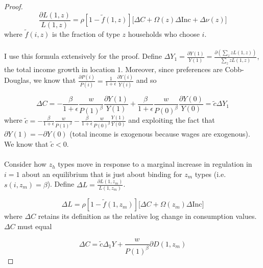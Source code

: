\documentclass[12pt]{article}
\begin{document}
\begin{enumerate}
\begin{proof}
		 \begin{equation}\label{AppendixEq:PopulationFormula}
			\frac{\partial L(1, z)}{L(1, z)} = \rho[1 - \tilde{f}(1, z)]\big[ \Delta C + \Omega(z)\Delta \text{Inc} + \Delta \nu(z) \big]
					 \end{equation}
		where $\tilde{f}(i, z)$ is the fraction of type $z$ households who choose $i$. 
		
		\paragraph*{}
		I use this formula extensively for the proof. Define $\Delta Y_{1} = \frac{\partial Y(1)}{Y(1)} =  \frac{\partial (\sum_{z}zL(1, z))}{\sum_{z}zL(1, z)}$, the total income growth in location $1$. Moreover, since preferences are Cobb-Douglas, we know that $\frac{\partial P(i)}{P(i)} = \frac{1}{1 + \epsilon}\frac{\partial Y(i)}{Y(i)}$ and so 
		
		   \begin{equation*}
					 	\Delta C = -\frac{\beta}{1 + \epsilon}\frac{w}{P(1)^{\beta}}\frac{\partial Y(1)}{Y(1)} + \frac{\beta}{1 + \epsilon}\frac{w}{P(0)^{\beta}}\frac{\partial Y(0)}{Y(0)} = \tilde{c}\Delta Y_{1}
			\end{equation*}
			where $\tilde{c} = -\frac{\beta}{1 + \epsilon}\frac{w}{P(1)^{\beta}} - \frac{\beta}{1 + \epsilon}\frac{w}{P(0)^{\beta}}\frac{Y(1)}{Y(0)}$ and exploiting the fact that $\partial Y(1) = -\partial Y(0)$ (total income is exogenous because wages are exogenous). We know that $\tilde{c} < 0$. 
			
			
			\paragraph*{}
			Consider how $z_{h}$ types move in response to a marginal increase in regulation in $i=1$ about an equilibrium that is just about binding for $z_{m}$ types (i.e. $s(i, z_{m}) = \beta$). Define $\Delta L = \frac{\partial L(1, z_{m})}{L(1, z_{m})}$. 
			
			\begin{equation*}
					\Delta L = \rho[1 - \tilde{f}(1, z_{m})]\big[ \Delta C + \Omega(z_{m})\Delta \text{Inc} \big]
			\end{equation*}
			where $\Delta C$ retains its definition as the relative log change in consumption values. $\Delta C$ must equal
			
			\begin{equation*}
				\Delta C = \tilde{c}\Delta_{1}Y + \frac{w}{P(1)^{\beta}}\partial D(1, z_{m})
			\end{equation*}
			

\end{proof}
\end{enumerate}
\end{document}
